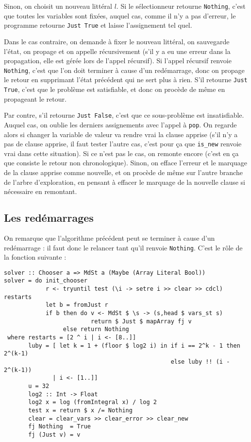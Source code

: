 Sinon, on choisit un nouveau littéral $l$. Si le sélectionneur retourne
\texttt{Nothing}, c'est que toutes les variables sont fixées, auquel cas, comme
il n'y a pas d'erreur, le programme retourne \texttt{Just True} et laisse
l'assignement tel quel.

Dans le cas contraire, on demande à fixer le nouveau littéral, on sauvegarde
l'état, on propage et on appelle récursivement (s'il y a eu une erreur dans la
propagation, elle est gérée lors de l'appel récursif). Si l'appel récursif
renvoie \texttt{Nothing}, c'est que l'on doit terminer à cause d'un
redémarrage, donc on propage le retour en supprimant l'état précédent qui ne
sert plus à rien. S'il retourne \texttt{Just True}, c'est que le problème
est satisfiable, et donc on procède de même en propageant le retour.

Par contre, s'il retourne \texttt{Just False}, c'est que ce sous-problème est
insatisfiable. Auquel cas, on oublie les derniers assignements avec l'appel
à \texttt{pop}. On regarde alors si changer la variable de valeur va
rendre vrai la clause apprise (s'il n'y a pas de clause apprise, il faut tester
l'autre cas, c'est pour ça que \texttt{is\_new} renvoie vrai dans cette
situation). Si ce n'est pas le cas, on remonte encore (c'est en ça que consiste
le retour non chronologique). Sinon, on efface l'erreur et le marquage de la
clause apprise comme nouvelle, et on procède de même sur l'autre branche de
l'arbre d'exploration, en pensant à effacer le marquage de la nouvelle clause
si nécessaire en remontant.

\subsection{Les redémarrages}
On remarque que l'algorithme précédent peut se terminer à cause d'un
redémarrage : il faut donc le relancer tant qu'il renvoie \texttt{Nothing}.
C'est le rôle de la fonction suivante :
\begin{lstlisting}
solver :: Chooser a => MdSt a (Maybe (Array Literal Bool))
solver = do init_chooser
            r <- tryuntil test (\i -> setre i >> clear >> cdcl) restarts
            let b = fromJust r
            if b then do v <- MdSt $ \s -> (s,head $ vars_st s)
                         return $ Just $ mapArray fj v
                 else return Nothing
 where restarts = [2 ^ i | i <- [8..]]
       luby = [ let k = 1 + (floor $ log2 i) in if i == 2^k - 1 then 2^(k-1)
                                                else luby !! (i - 2^(k-1))
              | i <- [1..]]
       u = 32
       log2 :: Int -> Float
       log2 x = log (fromIntegral x) / log 2
       test x = return $ x /= Nothing
       clear = clear_vars >> clear_error >> clear_new
       fj Nothing  = True
       fj (Just v) = v
\end{lstlisting}%


